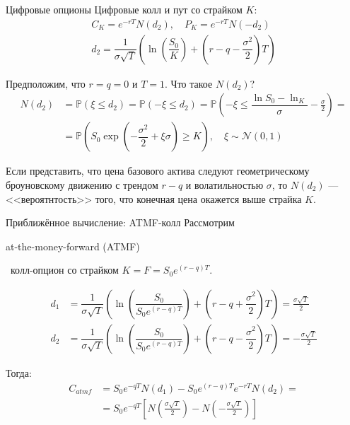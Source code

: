 \documentclass{beamer}
\newcommand{\en}[1]{\begin{otherlanguage}{english}#1\end{otherlanguage}}
\begin{document}
\begin{frame}{Цифровые опционы}
\justify
Цифровые колл и пут со страйком $K$:
\begin{align*}
C_K = e^{-rT}N(d_2), \quad P_K = e^{-rT}N(-d_2) \\
d_2 = \dfrac{1}{\sigma\sqrt{T}}\left( \ln\left(\dfrac{S_0}{K}\right) + \left(r -q- \dfrac{\sigma^2}{2}\right)T\right)
\end{align*}

\justify
Предположим, что $r=q=0$ и $T=1$. Что такое $N(d_2)$?
\begin{align*}
N(d_2) &= \mathbb{P}(\xi \le d_2) = 
\mathbb{P}(-\xi \le d_2) = \mathbb{P}\left(-\xi \le \dfrac{\ln S_0 - \ln_K}{\sigma} - \frac{\sigma}{2}\right) = \\
&= \mathbb{P}\left(S_0\exp\left(-\dfrac{\sigma^2}{2} + \xi\sigma\right) \ge K\right),
\quad \xi \sim \mathcal{N}(0,1)
\end{align*}

Если представить, что цена базового актива следуют геометрическому броуновскому 
движению с трендом $r-q$ и волатильностью $\sigma$, то $N(d_2)$ --- <<вероятнтость>>
того, что конечная цена окажется выше страйка $K$.

\end{frame}




\begin{frame}{Приближённое вычисление: ATMF-колл}
\justify
Рассмотрим \en{at-the-money-forward (ATMF)}\ колл-опцион со страйком $K = F = S_0e^{(r-q)T}$.

\begin{align*}
d_1 &= \dfrac{1}{\sigma\sqrt{T}}\left( \ln\left(\dfrac{S_0}{S_0e^{(r-q)T}}\right) + \left(r -q + \dfrac{\sigma^2}{2}\right)T\right) = \frac{\sigma \sqrt{T}}{2} \\
d_2 &= \dfrac{1}{\sigma\sqrt{T}}\left( \ln\left(\dfrac{S_0}{S_0e^{(r-q)T}}\right) + \left(r -q- \dfrac{\sigma^2}{2}\right)T\right) = -\frac{\sigma \sqrt{T}}{2}
\end{align*}

Тогда:
\begin{align*}
C_{atmf} &= S_0e^{-qT}N(d_1) - S_0e^{(r-q)T}e^{-rT}N(d_2) = \\
&= S_0e^{-qT}\left[
N\left(\frac{\sigma \sqrt{T}}{2}\right) - N\left(-\frac{\sigma \sqrt{T}}{2}\right)
\right]
\end{align*}
\end{frame}
\end{document}
